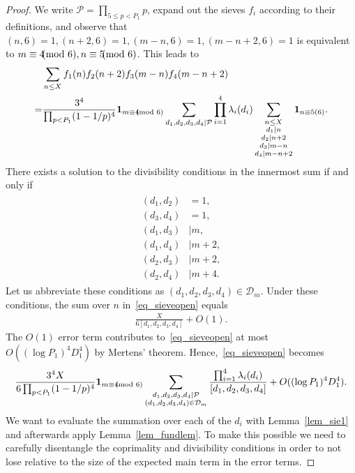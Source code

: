 \documentclass[12pt]{amsart}
\theoremstyle{definition}
\theoremstyle{remark}
\numberwithin{equation}{section}
\newcommand{\1}{\mathbf{1}}
\let\oldpmod\pmod
\renewcommand{\pmod}[1]{\hspace{-0.12cm}\oldpmod {#1}}
\begin{document}
\begin{proof}
We write  $\mathcal{P}=\prod_{5\leq p < P_1}p$, 
expand out the sieves $f_i$ according to their definitions, and observe that $(n,6)=1, (n+2,6)=1, (m-n,6)=1, (m-n+2,6)=1$ is equivalent to $m\equiv 4 \pmod 6, n\equiv 5\pmod 6$. This leads to
    \begin{align}
       \nonumber &\sum_{n\leq X} f_1(n)f_2(n+2) f_3(m-n)f_4(m-n+2) \\
        =& \frac{3^4}{\prod_{p<P_1}(1-1/p)^4} \1_{m\equiv 4\pmod 6} \sum_{d_1,d_2,d_3,d_4\mid\mathcal{P}}  \prod_{i=1}^4\lambda_{i}(d_i)\sum_{\substack{n\leq X\\ d_1\mid n \\ d_2\mid n+2 \\ d_3\mid m-n \\ d_4\mid m-n+2}} \1_{n\equiv 5(6)}. \label{eq_sieveopen}
	\end{align}
    There exists a solution to the divisibility conditions in the innermost sum if and only if 
	\begin{align}
\begin{aligned}
(d_1,d_2)&=1,\\
(d_3,d_4)&=1,\\
(d_1,d_3)&\mid m,\\
(d_1,d_4)&\mid m+2,\\
(d_2,d_3)&\mid m+2,\\
(d_2,d_4)&\mid m+4.
\end{aligned}
\label{eq:conditions}
\end{align}
Let us abbreviate these conditions as $(d_1,d_2,d_3,d_4)\in \mathcal{D}_m$.
	Under these conditions, the sum over $n$ in~\eqref{eq_sieveopen} equals
	\begin{align*}
		\frac{X}{6[d_1,d_2,d_3,d_4]}+O(1).
	\end{align*}
    The $O(1)$ error term contributes to~\eqref{eq_sieveopen} at most $O((\log P_1)^4D_1^4)$ by Mertens' theorem. Hence,~\eqref{eq_sieveopen} becomes 
    \begin{align}\label{eq:sievemainsum}
     \frac{3^4 X}{6\prod_{p<P_1}(1-1/p)^4} \1_{m\equiv 4 \pmod 6}  \sum_{\substack{d_1,d_2,d_3,d_4\mid\mathcal{P}\\ (d_1,d_2,d_3,d_4)\in \mathcal{D}_m}} \frac{\prod_{i=1}^4\lambda_{i}(d_i)}{[d_1,d_2,d_3,d_4]}+ O((\log P_1)^4D_1^4).
    \end{align}
    We want to evaluate the summation over each of the $d_i$ with Lemma~\ref{lem_sie1} and afterwards apply Lemma~\ref{lem_fundlem}. To make this possible we need to carefully disentangle the coprimality and divisibility conditions in order to not lose relative to the size of the expected main term in the error terms.


\end{proof}
\end{document}
